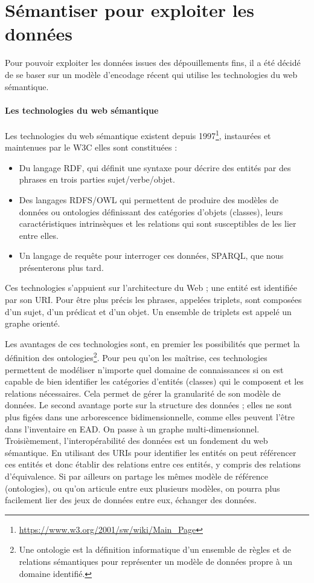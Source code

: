 \chapter{Sémantiser pour exploiter les données}
Pour pouvoir exploiter les données issues des dépouillements fins, il a été décidé de se baser sur un modèle d'encodage récent qui utilise les technologies du web sémantique. 
\subsubsection*{Les technologies du web sémantique}
Les technologies du web sémantique existent depuis 1997\footnote{\href{https://www.w3.org/2001/sw/wiki/Main\_Page}{https://www.w3.org/2001/sw/wiki/Main\_Page}}, instaurées et maintenues par le W3C elles sont constituées :
\begin{itemize}
    \item Du langage RDF, qui définit une syntaxe pour décrire des entités par des phrases en trois parties sujet/verbe/objet.
    \item Des langages RDFS/OWL qui permettent de produire des modèles de données ou ontologies définissant des catégories d'objets (classes), leurs caractéristiques intrinsèques et les relations qui sont susceptibles de les lier entre elles.
    \item Un langage de requête pour interroger ces données, SPARQL, que nous présenterons plus tard.
\end{itemize}
Ces technologies s'appuient sur l'architecture du Web ; une entité est identifiée par son URI. Pour être plus précis les phrases, appelées triplets, sont composées d'un sujet, d'un prédicat et d'un objet. Un ensemble de triplets est appelé un graphe orienté. 
\par
Les avantages de ces technologies sont, en premier les possibilités que permet la définition des ontologies\footnote{Une ontologie est la définition informatique d'un ensemble de règles et de relations sémantiques pour représenter un modèle de données propre à un domaine identifié.}. Pour peu qu'on les maîtrise, ces technologies permettent de modéliser n'importe quel domaine de connaissances si on est capable de bien identifier les catégories d'entités (classes) qui le composent et les relations nécessaires. Cela permet de gérer la granularité de son modèle de données. Le second avantage porte sur la structure des données ; elles ne sont plus figées dans une arborescence bidimensionnelle, comme elles peuvent l'être dans l'inventaire en EAD. On passe à un graphe multi-dimensionnel. Troisièmement, l'interopérabilité des données est un fondement du web sémantique. En utilisant des URIs pour identifier les entités on peut référencer ces entités et donc établir des relations entre ces entités, y compris des relations d'équivalence. Si par ailleurs on partage les mêmes modèle de référence (ontologies), ou qu'on articule entre eux plusieurs modèles, on pourra plus facilement lier des jeux de données entre eux, échanger des données.

